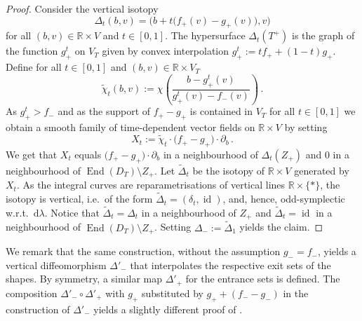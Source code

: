 \documentclass{amsart}
\theoremstyle{definition}
\newcommand{\rmd}{\mathrm d}
\newcommand{\R}{\mathbb R}
\DeclareMathOperator{\End}{\mathrm{End}}
\DeclareMathOperator{\id}{\mathrm{id}}
\begin{document}
\begin{proof}
Consider the vertical isotopy
 \[
   \Delta_t(b,v)=\Big(b+t\big(f_+(v)-g_+(v)\big),v\Big)
 \]
for all $(b,v)\in\R\times V$ and $t\in[0,1]$.
The hypersurface $\Delta_t(T^+)$
is the graph of the function $g_+^t$ on $V_T$
given by convex interpolation $g_+^t:=tf_++(1-t)g_+$.
Define for all $t\in[0,1]$ and $(b,v)\in\R\times V_T$
\[
\tilde{\chi}_t(b,v):=
\chi\left(\frac{b-g_+^t(v)}{g_+^t(v)-f_-(v)}\right)
\,.
\]
As $g_+^t>f_-$ and
as the support of $f_+-g_+$ is contained in $V_T$
for all $t\in[0,1]$ we obtain a smooth family
of time-dependent vector fields
on $\R\times V$ by setting
\[
X_t:=\tilde{\chi}_t\!\cdot\!\big(f_+-g_+\big)\!\cdot\partial_b
\,.
\]
We get that $X_t$ equals
$\big(f_+-g_+\big)\!\cdot\partial_b$
in a neighbourhood of $\Delta_t(Z_+)$
and $0$ in a neighbourhood of
$\End(D_T)\setminus Z_+$.
Let $\tilde{\Delta}_t$ be the isotopy of $\R\times V$
generated by $X_t$.
As the integral curves are reparametrisations
of vertical lines $\R\times\{*\}$,
the isotopy is vertical, i.e.\ of the form
$\tilde{\Delta}_t=(\delta_t,\id)$, and, hence,
odd-symplectic w.r.t.\ $\rmd\lambda$.
Notice that $\tilde{\Delta}_t=\Delta_t$
in a neighbourhood of $Z_+$
and
$\tilde{\Delta}_t=\id$
in a neighbourhood of $\End(D_T)\setminus Z_+$.
Setting $\Delta_-:=\tilde{\Delta}_1$ yields the claim.
\end{proof}


We remark that the same construction,
without the assumption $g_-=f_-$,
yields a vertical diffeomorphism $\Delta'_-$
that interpolates the respective exit sets of the shapes.
By symmetry, a similar map $\Delta'_+$ for the entrance sets
is defined.
The composition $\Delta'_-\circ\Delta'_+$
with $g_+$ substituted by $g_++(f_--g_-)$
in the construction of $\Delta'_-$
yields a slightly different proof of
\cite[Lemma~4.1.1 and Remark~4.1.2]{efz}.
\end{document}

